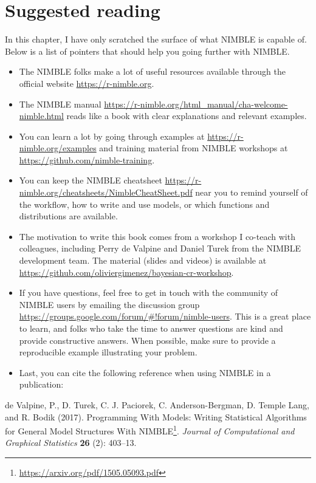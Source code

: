 \documentclass[
  12pt,
]{krantz}
\renewenvironment{quote}{\begin{VF}}{\end{VF}}
\renewcommand{\href}[2]{#2\footnote{\url{#1}}}
\begin{document}
\hypertarget{suggested-reading-1}{%
\section{Suggested reading}\label{suggested-reading-1}}

In this chapter, I have only scratched the surface of what NIMBLE is capable of. Below is a list of pointers that should help you going further with NIMBLE.

\begin{itemize}
\item
  The NIMBLE folks make a lot of useful resources available through the official website \url{https://r-nimble.org}.
\item
  The NIMBLE manual \url{https://r-nimble.org/html_manual/cha-welcome-nimble.html} reads like a book with clear explanations and relevant examples.
\item
  You can learn a lot by going through examples at \url{https://r-nimble.org/examples} and training material from NIMBLE workshops at \url{https://github.com/nimble-training}.
\item
  You can keep the NIMBLE cheatsheet \url{https://r-nimble.org/cheatsheets/NimbleCheatSheet.pdf} near you to remind yourself of the workflow, how to write and use models, or which functions and distributions are available.
\item
  The motivation to write this book comes from a workshop I co-teach with colleagues, including Perry de Valpine and Daniel Turek from the NIMBLE development team. The material (slides and videos) is available at \url{https://github.com/oliviergimenez/bayesian-cr-workshop}.
\item
  If you have questions, feel free to get in touch with the community of NIMBLE users by emailing the discussion group \url{https://groups.google.com/forum/\#!forum/nimble-users}. This is a great place to learn, and folks who take the time to answer questions are kind and provide constructive answers. When possible, make sure to provide a reproducible example illustrating your problem.
\item
  Last, you can cite the following reference when using NIMBLE in a publication:
\end{itemize}

\begin{quote}
de Valpine, P., D. Turek, C. J. Paciorek, C. Anderson-Bergman, D. Temple Lang, and R. Bodik (2017). \href{https://arxiv.org/pdf/1505.05093.pdf}{Programming With Models: Writing Statistical Algorithms for General Model Structures With NIMBLE}. \emph{Journal of Computational and Graphical Statistics} \textbf{26} (2): 403--13.
\end{quote}
\end{document}
